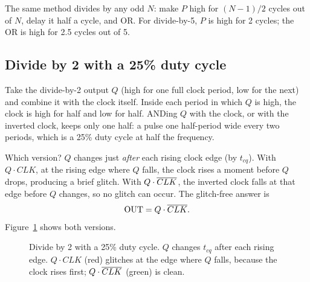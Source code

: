 The same method divides by any odd $N$: make $P$ high for $(N-1)/2$ cycles out of $N$, delay it half a cycle, and OR. For divide-by-5, $P$ is high for 2 cycles; the OR is high for 2.5 cycles out of 5.

\subsection*{Divide by 2 with a 25\% duty cycle}

Take the divide-by-2 output $Q$ (high for one full clock period, low for the next) and combine it with the clock itself. Inside each period in which $Q$ is high, the clock is high for half and low for half. ANDing $Q$ with the clock, or with the inverted clock, keeps only one half: a pulse one half-period wide every two periods, which is a 25\% duty cycle at half the frequency.

Which version? $Q$ changes just \emph{after} each rising clock edge (by $t_{cq}$). With $Q \cdot CLK$, at the rising edge where $Q$ falls, the clock rises a moment before $Q$ drops, producing a brief glitch. With $Q \cdot \overline{CLK}$, the inverted clock falls at that edge before $Q$ changes, so no glitch can occur. The glitch-free answer is
\[
  \text{OUT} = Q \cdot \overline{CLK}.
\]
Figure~\ref{fig:divglitch} shows both versions.

\begin{figure}[h]
\centering
{}
\caption{Divide by 2 with a 25\% duty cycle. $Q$ changes $t_{cq}$ after each rising edge. $Q \cdot CLK$ (red) glitches at the edge where $Q$ falls, because the clock rises first; $Q \cdot \overline{CLK}$ (green) is clean.}
\label{fig:divglitch}
\end{figure}

